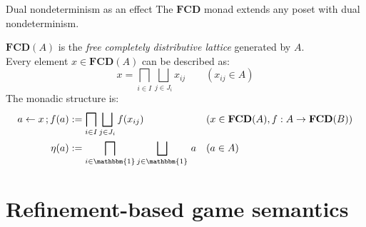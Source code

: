 \documentclass{beamer}
\begin{document}
\begin{frame}{Dual nondeterminism as an effect} %
The $\mathbf{FCD}$ monad extends any poset with dual nondeterminism.

\pause
\begin{definition}
$\mathbf{FCD}(A)$ is the \emph{free completely distributive lattice}
generated by $A$. \\
Every element $x \in \mathbf{FCD}(A)$ can be described as:
\[
  x = \bigsqcap_{i \in I} \bigsqcup_{j \in J_i} x_{ij}
  \qquad (x_{ij} \in A)
\]
The monadic structure is:
\begin{align*}
  a \leftarrow x \mathop{;} f(a) &:=
    \bigsqcap_{i \in I}
    \bigsqcup_{j \in J_i}
    f(x_{ij}) & &
    (x \in \mathbf{FCD}(A),
     f : A \rightarrow \mathbf{FCD}(B))
  \\
  \eta(a) &:=
    \bigsqcap_{i \in \mathbbm{1}}
    \bigsqcup_{j \in \mathbbm{1}}
    \, a & & (a \in A)
\end{align*}
\end{definition}
\end{frame}


\section{Refinement-based game semantics} %
\end{document}
